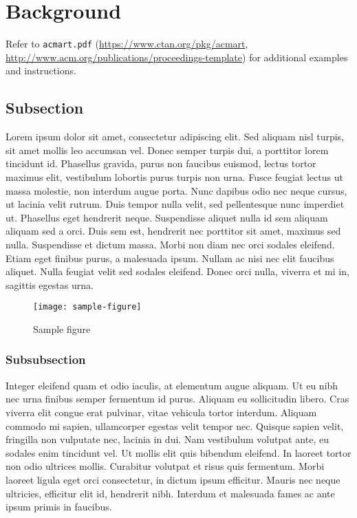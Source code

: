 \section{Background}

Refer to \verb|acmart.pdf| \cite{veytsmanlatex} (\url{https://www.ctan.org/pkg/acmart}, \url{http://www.acm.org/publications/proceedings-template}) for additional examples and instructions.

\subsection{Subsection}

Lorem ipsum dolor sit amet, consectetur adipiscing elit.
Sed aliquam nisl turpis, sit amet mollis leo accumsan vel.
Donec semper turpis dui, a porttitor lorem tincidunt id.
Phasellus gravida, purus non faucibus euismod, lectus tortor maximus elit, vestibulum lobortis purus turpis non urna.
Fusce feugiat lectus ut massa molestie, non interdum augue porta.
Nunc dapibus odio nec neque cursus, ut lacinia velit rutrum.
Duis tempor nulla velit, sed pellentesque nunc imperdiet ut.
Phasellus eget hendrerit neque.
Suspendisse aliquet nulla id sem aliquam aliquam sed a orci.
Duis sem est, hendrerit nec porttitor sit amet, maximus sed nulla.
Suspendisse et dictum massa.
Morbi non diam nec orci sodales eleifend.
Etiam eget finibus purus, a malesuada ipsum.
Nullam ac nisi nec elit faucibus aliquet.
Nulla feugiat velit sed sodales eleifend.
Donec orci nulla, viverra et mi in, sagittis egestas urna.

\begin{figure}[htbp]
  \centering
  \texttt{[image: sample-figure]}
  \caption{Sample figure}
  \label{fig2:../Figures/sample}
\end{figure}

\subsubsection{Subsubsection}

Integer eleifend quam et odio iaculis, at elementum augue aliquam.
Ut eu nibh nec urna finibus semper fermentum id purus.
Aliquam eu sollicitudin libero.
Cras viverra elit congue erat pulvinar, vitae vehicula tortor interdum.
Aliquam commodo mi sapien, ullamcorper egestas velit tempor nec.
Quisque sapien velit, fringilla non vulputate nec, lacinia in dui.
Nam vestibulum volutpat ante, eu sodales enim tincidunt vel.
Ut mollis elit quis bibendum eleifend.
In laoreet tortor non odio ultrices mollis.
Curabitur volutpat et risus quis fermentum.
Morbi laoreet ligula eget orci consectetur, in dictum ipsum efficitur.
Mauris nec neque ultricies, efficitur elit id, hendrerit nibh.
Interdum et malesuada fames ac ante ipsum primis in faucibus.

